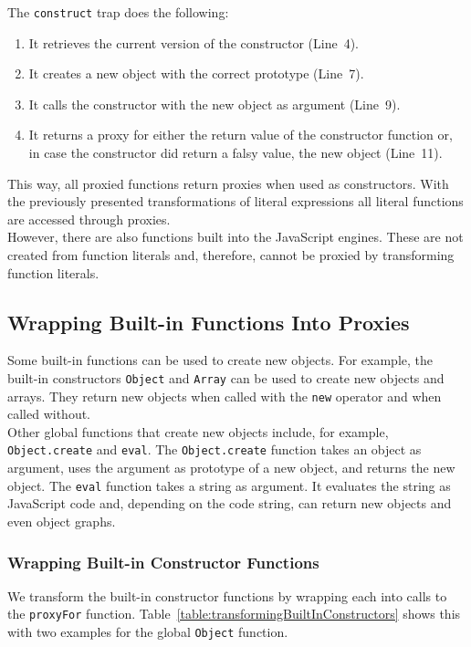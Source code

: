 The \lstinline{construct} trap does the following:
\begin{enumerate}
    \item It retrieves the current version of the constructor (Line~4).
    \item It creates a new object with the correct prototype (Line~7).
    \item It calls the constructor with the new object as argument (Line~9).
    \item It returns a proxy for either the return value of the constructor function or, in case the constructor did return a falsy value, the new object (Line~11).
\end{enumerate}

This way, all proxied functions return proxies when used as constructors.
With the previously presented transformations of literal expressions all literal functions are accessed through proxies.\\
However, there are also functions built into the JavaScript engines.
These are not created from function literals and, therefore, cannot be proxied by transforming function literals.


\subsection{Wrapping Built-in Functions Into Proxies}

Some built-in functions can be used to create new objects.
For example, the built-in constructors \lstinline{Object} and \lstinline{Array} can be used to create new objects and arrays.
They return new objects when called with the \lstinline{new} operator and when called without.\\
Other global functions that create new objects include, for example, \lstinline{Object.create} and \lstinline{eval}.
The \lstinline{Object.create} function takes an object as argument, uses the argument as prototype of a new object, and returns the new object.
The \lstinline{eval} function takes a string as argument.
It evaluates the string as JavaScript code and, depending on the code string, can return new objects and even object graphs.


\subsubsection{Wrapping Built-in Constructor Functions}

We transform the built-in constructor functions by wrapping each into calls to the \lstinline{proxyFor} function.
Table~\ref{table:transformingBuiltInConstructors} shows this with two examples for the global \lstinline{Object} function.

